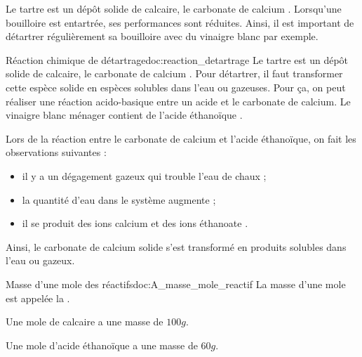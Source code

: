 \teteSndChim
\vspace*{-6pt}
\nomPrenomClasse
{}


\begin{contexte}
  Le tartre est un dépôt solide de calcaire, le carbonate de calcium .
  Lorsqu'une bouilloire est entartrée, ses performances sont réduites.
  Ainsi, il est important de détartrer régulièrement sa bouilloire avec du vinaigre blanc par exemple.
  
\end{contexte}


\begin{doc}{Réaction chimique de détartrage}{doc:reaction_detartrage}
  Le tartre est un dépôt solide de calcaire, le carbonate de calcium .
  Pour détartrer, il faut transformer cette espèce solide en espèces solubles dans l'eau ou gazeuses.
  Pour ça, on peut réaliser une réaction acido-basique entre un acide et le carbonate de calcium.
  Le vinaigre blanc ménager contient de l'acide éthanoïque .

  Lors de la réaction entre le carbonate de calcium et l'acide éthanoïque, on fait les observations suivantes :
  \begin{itemize}
    \item il y a un dégagement gazeux qui trouble l'eau de chaux ;
    \item la quantité d'eau dans le système augmente ;
    \item il se produit des ions calcium \ionCalcium et des ions éthanoate .
  \end{itemize}
    
  Ainsi, le carbonate de calcium solide s'est transformé en produits solubles dans l'eau ou gazeux.
\end{doc}

\begin{doc}{Masse d'une mole des réactifs}{doc:A_masse_mole_reactif}
  La masse d'une mole est appelée la .

  \begin{donnees}
    \item Une mole de calcaire  a une masse de $100 \unit{g}$.
    \item Une mole d'acide éthanoïque  a une masse de $60 \unit{g}$.
  \end{donnees}
\end{doc}


